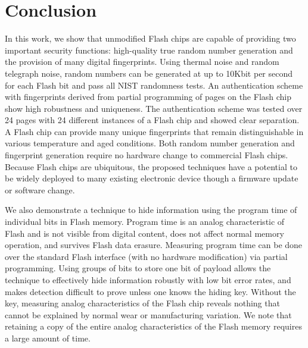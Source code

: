 \chapter{Conclusion}
\label{sec:conclusion}

In this work, we show that unmodified Flash chips are capable of providing two important security functions: high-quality true random number generation and the provision of many digital fingerprints. Using thermal noise and random telegraph noise, random numbers can be generated at up to 10Kbit per second for each Flash bit and pass all NIST randomness tests. An authentication scheme with fingerprints derived from partial programming of pages on the Flash chip show high robustness and uniqueness. The authentication scheme was tested over 24 pages with 24 different instances of a Flash chip and showed clear separation. A Flash chip can provide many unique fingerprints that remain distinguishable in various temperature and aged conditions. Both random number generation and fingerprint generation require no hardware change to commercial Flash chips. Because Flash chips are ubiquitous, the proposed techniques have a potential to be widely deployed to many existing electronic device though a firmware update or software change.

We also demonstrate a technique to hide information
using the program time of individual bits in Flash memory. 
Program time is an analog characteristic of Flash and is
not visible from digital content, does not affect normal
memory operation, and survives Flash data erasure. 
Measuring program time can be done over the 
standard Flash interface (with no hardware modification) via
partial programming. Using groups of bits to store one bit
of payload allows the technique to effectively hide information
robustly with low bit error rates, and makes detection difficult 
to prove unless one knows the hiding key. Without the key,
measuring analog characteristics of the Flash chip reveals
nothing that cannot be explained by normal wear or manufacturing
variation. We note that retaining a copy of the entire analog characteristics
of the Flash memory %
requires a large amount of time.


